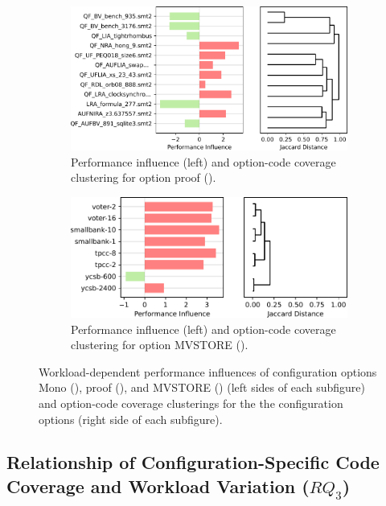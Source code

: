 {{{\begin{figure}
	\begin{subfigure}{\linewidth}
		\centering
		\vspace{2em}
		\includegraphics[width=0.99\linewidth]{rq23/proof.pdf}
		\caption{Performance influence (left) and option-code coverage clustering for option \textsf{proof} (\zdrei).}
		\label{fig:proof_z3}
	\end{subfigure}

	\begin{subfigure}{\linewidth}
		\centering
		\vspace{2em}
		\includegraphics[width=0.99\linewidth]{rq23/MVSTORE.pdf}
		\caption{Performance influence (left) and option-code coverage clustering for option \textsf{MVSTORE} (\htwo).}
		\label{fig:mvstore_h2}
	\end{subfigure}
\caption{Workload-dependent performance influences of configuration options \textsf{Mono} (\jumper), \textsf{proof} (\zdrei), and \textsf{MVSTORE} (\htwo) (left sides of each subfigure) and option-code coverage clusterings for the the configuration options (right side of each subfigure).}
\end{figure}

\subsection{Relationship of Configuration-Specific Code Coverage and Workload Variation ($RQ_3$)}\label{sec:rq3}\label{sec:categories}
}}}
